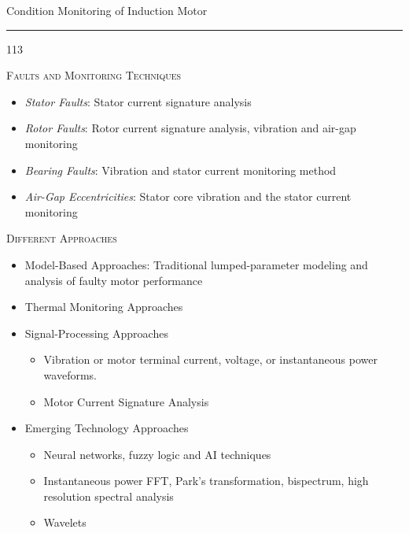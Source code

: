\documentclass[10pt]{beamer}
\begin{document}
\begin{slide*}
{\large \textsf{Condition Monitoring of Induction Motor}}\\
\hrule
\vspace{10pt}
\begin{dinglist} {113}
\item \textsc{Faults and Monitoring Techniques}
    \begin{itemize}
    \item \emph{Stator Faults}: Stator current signature analysis
    \item \emph{Rotor Faults}: Rotor current signature analysis, vibration and air-gap monitoring
    \item \emph{Bearing Faults}: Vibration and stator current monitoring method
    \item \emph{Air-Gap  Eccentricities}: Stator core vibration and the stator current monitoring
    \end{itemize}
\item \textsc{Different Approaches}
    \begin{itemize}
    \item Model-Based Approaches: Traditional lumped-parameter modeling and analysis of faulty motor performance
    \item Thermal Monitoring Approaches
    \item Signal-Processing Approaches
            \begin{itemize}
            \item Vibration or motor terminal current, voltage, or instantaneous power waveforms.
            \item Motor  Current  Signature  Analysis
            \end{itemize}
    \item Emerging Technology Approaches
            \begin{itemize}
            \item Neural networks, fuzzy logic and AI techniques
            \item Instantaneous power FFT, Park's transformation, bispectrum, high resolution spectral analysis
            \item Wavelets
            \end{itemize}
    \end{itemize}
\end{dinglist}
\end{slide*}
\end{document}

